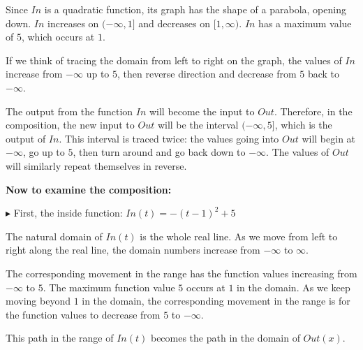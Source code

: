 \documentclass{ximera}
\begin{document}
Since $In$ is a quadratic function, its graph has the shape of a parabola, opening down.  $In$ increases on $(-\infty, 1]$ and decreases on $[1, \infty)$. $In$ has a maximum value of $5$, which occurs at $1$. 

If we think of tracing the domain from left to right on the graph, the values of $In$ increase from $-\infty$ up to $5$, then reverse direction and decrease from $5$ back to $-\infty$.


The output from the function $In$ will become the input to $Out$.  Therefore, in the composition, the new input to $Out$ will be the interval $(-\infty, 5]$, which is the output of $In$. This interval is traced twice: the values going into $Out$ will begin at $-\infty$, go up to $5$, then turn around and go back down to $-\infty$. The values of $Out$ will similarly repeat themselves in reverse.






\textbf{\textcolor{purple!85!blue}{Now to examine the composition:}} 



\textbf{\textcolor{blue!75!black}{$\blacktriangleright$}}   First, the inside function: $In(t) = -(t-1)^2 + 5$ 

The natural domain of $In(t)$ is the whole real line. As we move from left to right along the real line, the domain numbers increase from $-\infty$ to $\infty$.

The corresponding movement in the range has the function values increasing from $-\infty$ to $5$.  The maximum function value $5$ occurs at $1$ in the domain.  As we keep moving beyond $1$ in the domain, the corresponding movement in the range is for the function values to decrease from $5$ to $-\infty$.


This path in the range of $In(t)$ becomes the path in the domain of $Out(x)$. 
\end{document}
